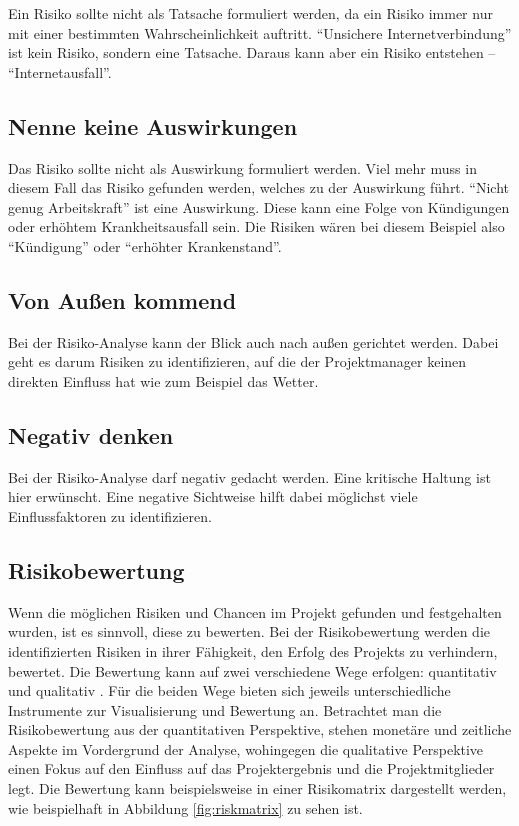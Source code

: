 \documentclass[ThesisDJ.tex]{subfiles}
\begin{document}
Ein Risiko sollte nicht als Tatsache formuliert werden, da ein Risiko immer nur mit einer bestimmten Wahrscheinlichkeit auftritt. “Unsichere Internetverbindung” ist kein Risiko, sondern eine Tatsache. Daraus kann aber ein Risiko entstehen – “Internetausfall”.

\subsection{Nenne keine Auswirkungen}

Das Risiko sollte nicht als Auswirkung formuliert werden. Viel mehr muss in diesem Fall das Risiko gefunden werden, welches zu der Auswirkung führt. “Nicht genug  Arbeitskraft” ist eine Auswirkung. Diese kann eine Folge von Kündigungen oder erhöhtem Krankheitsausfall sein. Die Risiken wären bei diesem Beispiel also “Kündigung” oder “erhöhter Krankenstand”.


\subsection{Von Außen kommend}

Bei der Risiko-Analyse kann der Blick auch nach außen gerichtet werden. Dabei geht es darum Risiken zu identifizieren, auf die der Projektmanager keinen direkten Einfluss hat wie zum Beispiel das Wetter. 

\subsection{Negativ denken}

Bei der Risiko-Analyse darf negativ gedacht werden. Eine kritische Haltung ist hier erwünscht. Eine negative Sichtweise hilft dabei möglichst viele Einflussfaktoren zu identifizieren.


\subsection{Risikobewertung}
Wenn die möglichen Risiken und Chancen im Projekt gefunden und festgehalten wurden, ist es sinnvoll, diese zu bewerten. Bei der Risikobewertung werden die identifizierten Risiken in ihrer Fähigkeit, den Erfolg des Projekts zu verhindern, bewertet. Die Bewertung kann auf zwei verschiedene Wege erfolgen: quantitativ und qualitativ \cite[S.~300 ff.]{patzak2017projektmanagement}. Für die beiden Wege bieten sich jeweils unterschiedliche Instrumente zur Visualisierung und Bewertung an. Betrachtet man die Risikobewertung aus der quantitativen Perspektive, stehen monetäre und zeitliche Aspekte im Vordergrund der Analyse, wohingegen die qualitative Perspektive einen Fokus auf den Einfluss auf das Projektergebnis und die Projektmitglieder legt. Die Bewertung kann beispielsweise in einer Risikomatrix dargestellt werden, wie beispielhaft in Abbildung \ref{fig:riskmatrix}\cite[S.~24]{cicek2022risikomanagement} zu sehen ist.
\end{document}
